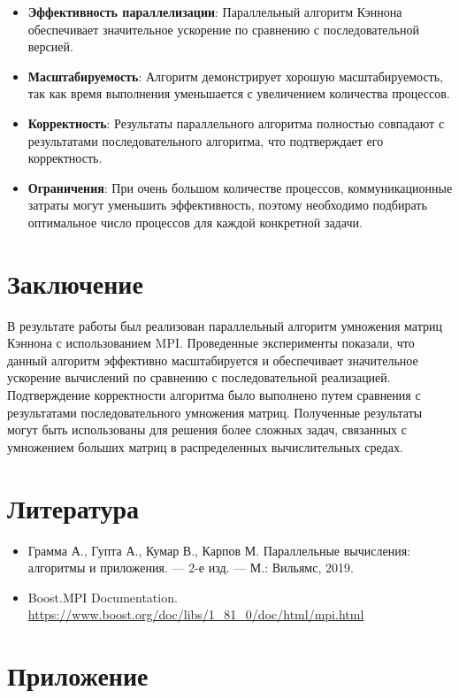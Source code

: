 \documentclass[12pt]{article}
\begin{document}
\begin{itemize}
    \item \textbf{Эффективность параллелизации}: Параллельный алгоритм Кэннона обеспечивает значительное ускорение по сравнению с последовательной версией.
    \item \textbf{Масштабируемость}: Алгоритм демонстрирует хорошую масштабируемость, так как время выполнения уменьшается с увеличением количества процессов.
    \item \textbf{Корректность}: Результаты параллельного алгоритма полностью совпадают с результатами последовательного алгоритма, что подтверждает его корректность.
    \item \textbf{Ограничения}: При очень большом количестве процессов, коммуникационные затраты могут уменьшить эффективность, поэтому необходимо подбирать оптимальное число процессов для каждой конкретной задачи.
\end{itemize}

\section{Заключение}
В результате работы был реализован параллельный алгоритм умножения матриц Кэннона с использованием MPI. Проведенные эксперименты показали, что данный алгоритм эффективно масштабируется и обеспечивает значительное ускорение вычислений по сравнению с последовательной реализацией. Подтверждение корректности алгоритма было выполнено путем сравнения с результатами последовательного умножения матриц. Полученные результаты могут быть использованы для решения более сложных задач, связанных с умножением больших матриц в распределенных вычислительных средах.

\section{Литература}
\begin{itemize}
    \item Грамма А., Гупта А., Кумар В., Карпов М. Параллельные вычисления: алгоритмы и приложения. — 2-е изд. — М.: Вильямс, 2019.
    \item Boost.MPI Documentation. \url{https://www.boost.org/doc/libs/1_81_0/doc/html/mpi.html}
\end{itemize}

\section{Приложение}
\end{document}
